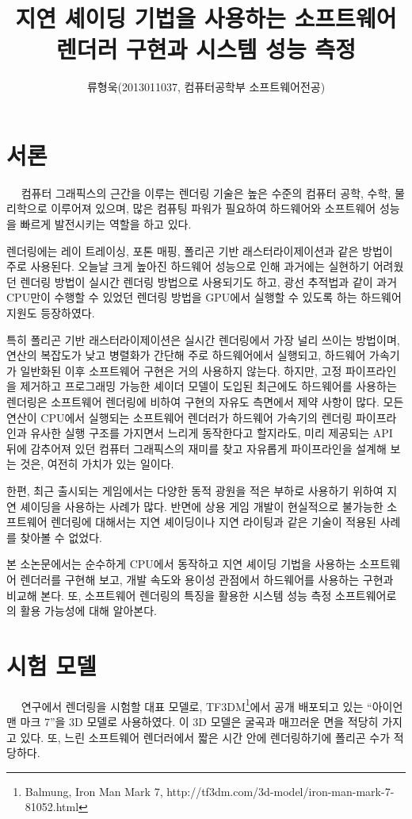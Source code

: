 \documentclass[a4paper,itemph,amsmath,oneside,11pt,openany]{xoblivoir}
\begin{document}
\title{지연 셰이딩 기법을 사용하는 소프트웨어 렌더러 구현과 시스템 성능 측정}
\author{류형욱(2013011037, 컴퓨터공학부 소프트웨어전공)}
\date{}
\maketitle
\tableofcontents
\section{서론}
　 컴퓨터 그래픽스의 근간을 이루는 렌더링 기술은 높은 수준의 컴퓨터 공학, 수학, 물리학으로 이루어져 있으며,
많은 컴퓨팅 파워가 필요하여 하드웨어와 소프트웨어 성능을 빠르게 발전시키는 역할을 하고 있다.

렌더링에는 레이 트레이싱, 포톤 매핑, 폴리곤 기반 래스터라이제이션과 같은 방법이 주로 사용된다.
오늘날 크게 높아진 하드웨어 성능으로 인해 과거에는 실현하기 어려웠던 렌더링 방법이 실시간 렌더링 방법으로 사용되기도 하고,
광선 추적법과 같이 과거 CPU만이 수행할 수 있었던 렌더링 방법을 GPU에서 실행할 수 있도록 하는 하드웨어 지원도 등장하였다.

특히 폴리곤 기반 래스터라이제이션은 실시간 렌더링에서 가장 널리 쓰이는 방법이며, 연산의 복잡도가 낮고 병렬화가 간단해
주로 하드웨어에서 실행되고, 하드웨어 가속기가 일반화된 이후 소프트웨어 구현은 거의 사용하지 않는다.
하지만, 고정 파이프라인을 제거하고 프로그래밍 가능한 셰이더 모델이 도입된 최근에도 하드웨어를 사용하는 렌더링은
소프트웨어 렌더링에 비하여 구현의 자유도 측면에서 제약 사항이 많다. 모든 연산이 CPU에서 실행되는 소프트웨어 렌더러가
하드웨어 가속기의 렌더링 파이프라인과 유사한 실행 구조를 가지면서 느리게 동작한다고 할지라도, 미리 제공되는 API 뒤에
감추어져 있던 컴퓨터 그래픽스의 재미를 찾고 자유롭게 파이프라인을 설계해 보는 것은, 여전히 가치가 있는 일이다.

한편, 최근 출시되는 게임에서는 다양한 동적 광원을 적은 부하로 사용하기 위하여 지연 셰이딩을 사용하는 사례가 많다.
반면에 상용 게임 개발이 현실적으로 불가능한 소프트웨어 렌더링에 대해서는 지연 셰이딩이나 지연 라이팅과 같은
기술이 적용된 사례를 찾아볼 수 없었다.

본 소논문에서는 순수하게 CPU에서 동작하고 지연 셰이딩 기법을 사용하는 소프트웨어 렌더러를 구현해 보고,
개발 속도와 용이성 관점에서 하드웨어를 사용하는 구현과 비교해 본다. 또, 소프트웨어 렌더링의 특징을 활용한
시스템 성능 측정 소프트웨어로의 활용 가능성에 대해 알아본다.

\section{시험 모델}
　 연구에서 렌더링을 시험할 대표 모델로, TF3DM\footnote{\cite{model}Balmung, Iron Man Mark 7, http://tf3dm.com/3d-model/iron-man-mark-7-81052.html}에서
공개 배포되고 있는 ``아이언 맨 마크 7''을 3D 모델로 사용하였다. 이 3D 모델은 굴곡과 매끄러운 면을 적당히 가지고 있다.
또, 느린 소프트웨어 렌더러에서 짧은 시간 안에 렌더링하기에 폴리곤 수가 적당하다.
\end{document}
